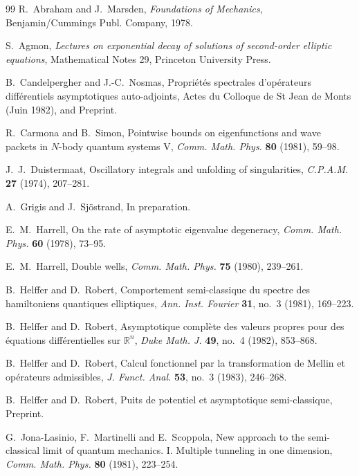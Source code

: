 \documentclass[11pt,a4paper]{article}
\newcommand{\R}{\mathbb R}
\numberwithin{equation}{section}
\theoremstyle{remark}
\begin{document}
\begin{thebibliography}{99}
R.~Abraham and J.~Marsden,
\emph{Foundations of Mechanics}, Benjamin/Cummings Publ. Company, 1978.

S.~Agmon,
\emph{Lectures on exponential decay of solutions of second-order elliptic equations},
Mathematical Notes 29, Princeton University Press.

B.~Candelpergher and J.-C.~Nosmas,
Propri\'et\'es spectrales d'op\'erateurs diff\'erentiels asymptotiques auto-adjoints,
Actes du Colloque de St Jean de Monts (Juin 1982), and Preprint.

R.~Carmona and B.~Simon,
Pointwise bounds on eigenfunctions and wave packets in $N$-body quantum systems V,
\emph{Comm. Math. Phys.} \textbf{80} (1981), 59--98.

J.~J.~Duistermaat,
Oscillatory integrals and unfolding of singularities,
\emph{C.P.A.M.} \textbf{27} (1974), 207--281.

A.~Grigis and J.~Sj\"ostrand, In preparation.

E.~M.~Harrell,
On the rate of asymptotic eigenvalue degeneracy,
\emph{Comm. Math. Phys.} \textbf{60} (1978), 73--95.

E.~M.~Harrell,
Double wells,
\emph{Comm. Math. Phys.} \textbf{75} (1980), 239--261.

B.~Helffer and D.~Robert,
Comportement semi-classique du spectre des hamiltoniens quantiques elliptiques,
\emph{Ann. Inst. Fourier} \textbf{31}, no.~3 (1981), 169--223.

B.~Helffer and D.~Robert,
Asymptotique compl\`ete des valeurs propres pour des \'equations diff\'erentielles sur $\R^n$,
\emph{Duke Math. J.} \textbf{49}, no.~4 (1982), 853--868.

B.~Helffer and D.~Robert,
Calcul fonctionnel par la transformation de Mellin et op\'erateurs admissibles,
\emph{J. Funct. Anal.} \textbf{53}, no.~3 (1983), 246--268.

B.~Helffer and D.~Robert,
Puits de potentiel et asymptotique semi-classique, Preprint.

G.~Jona-Lasinio, F.~Martinelli and E.~Scoppola,
New approach to the semi-classical limit of quantum mechanics. I. Multiple tunneling in one dimension,
\emph{Comm. Math. Phys.} \textbf{80} (1981), 223--254.


\end{thebibliography}
\end{document}
